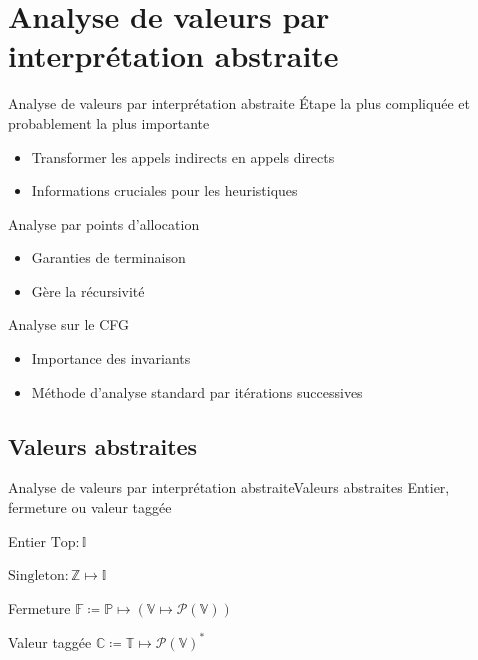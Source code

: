 \documentclass{beamer}
\begin{document}
\section{Analyse de valeurs par interprétation abstraite}

\begin{frame}{Analyse de valeurs par interprétation abstraite}
    Étape la plus compliquée et probablement la plus importante

    \begin{itemize}
        \item Transformer les appels indirects en appels directs
        \item Informations cruciales pour les heuristiques
    \end{itemize}

    Analyse par points d'allocation

    \begin{itemize}
        \item Garanties de terminaison
        \item Gère la récursivité
    \end{itemize}

    Analyse sur le CFG

    \begin{itemize}
        \item Importance des invariants
        \item Méthode d'analyse standard par itérations successives
    \end{itemize}
\end{frame}

\subsection{Valeurs abstraites}

\begin{frame}{Analyse de valeurs par interprétation abstraite}{Valeurs abstraites}
    Entier, fermeture ou valeur taggée

    \begin{block}{Entier}
        $\text{Top} : \mathbb{I}$

        $\text{Singleton} : \mathbb{Z} \mapsto \mathbb{I}$
    \end{block}

    \begin{block}{Fermeture}
        $\mathbb{F} \coloneqq \mathbb{P} \mapsto (\mathbb{V} \mapsto \mathcal{P}(\mathbb{V}))$
    \end{block}

    \begin{block}{Valeur taggée}
        $\mathbb{C} \coloneqq \mathbb{T} \mapsto \mathcal{P}(\mathbb{V})^{*}$
    \end{block}
\end{frame}
\end{document}
